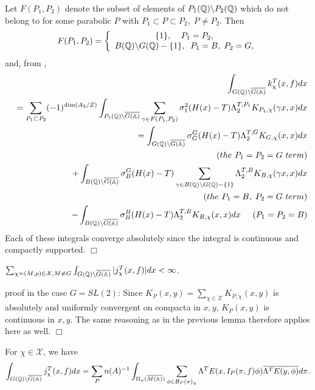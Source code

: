 Let $F(P_1,P_2)$ denote the subset of elements of
$P_1(\mathbb{Q} )\backslash P_2(\mathbb{Q} )$ which do not belong
to for some parabolic $P$ with $P_1\subset
P\subset P_2,\;P\neq P_2$. Then 
\[
F(P_1,P_2)=\left\{ 
\begin{array}{c}
\{1\},\;\;\;\;P_1=P_2, \\ 
B(\mathbb{Q} )\backslash G(\mathbb{Q} )-\{1\},\;\;P_1=B,\;P_2=G,
\end{array}
\right. 
\]
and, from \cite[p. 105]{A3}, 
\begin{eqnarray*}
&&\int_{G(\mathbb{Q} )\backslash \overline{G(\mathbb{A} )}}
k_\chi ^T(x,f)dx \\
&&=\sum_{P_1\subset P_2}(-1)^{\dim (A_2/Z)}
\int_{P_1(\mathbb{Q} )\backslash \overline{G(\mathbb{A} )}}
\sum_{\gamma \in F(P_1,P_2)}\sigma _1^2(H(x)-T)
\Lambda_2^{T,P_1}K_{P_1,\chi }(\gamma x,x)dx \\
&&=\int_{G(\mathbb{Q} )\backslash \overline{G(\mathbb{A} )}}
\sigma _G^G(H(x)-T)\Lambda_2^{T,G}K_{G,\chi }(x,x)dx\\
&&\;\;\;\;\;(the\ P_1=P_2=G\ term) \\
&&+\int_{B(\mathbb{Q} )\backslash \overline{G(\mathbb{A} )}}
\sigma _B^G(H(x)-T)
\sum_{\gamma\in B(\mathbb{Q} )\backslash G(\mathbb{Q} )-\{1\}}
\Lambda _2^{T,B}K_{B,\chi }(\gamma x,x)dx\\
&&\;\;\;\;\;(the\ P_1 =B,\;P_2=G\ term) \\
&&-\int_{B(\mathbb{Q} )\backslash \overline{G(\mathbb{A} )}}
\sigma _B^B(H(x)-T)\Lambda_2^{T,B}K_{B,\chi }(x,x)dx
\;\;\;\;\;(P_1 =P_2=B)
\end{eqnarray*}
Each of these integrals converge absolutely since the integral is continuous
and compactly supported. $\Box $

\begin{lemma}\label{lem:5.25}
$\sum_{ \chi =(M,\rho )\in \mathcal{X}, M\neq G }
\int_{G(\mathbb{Q} )\backslash \overline{G(\mathbb{A} )}}
|j_\chi ^T(x,f)|dx<\infty $.
\end{lemma}

proof in the case $G=SL(2)$: Since
$K_P(x,y)=\sum_{\chi \in {\mathcal{X}}}K_{P,\chi }(x,y)$
is absolutely and uniformly convergent on compacta in
$x,y $, $K_P(x,y)$ is continuous in $x,y$. The same
reasoning as in the
previous lemma therefore applies here as well. $\Box $

\begin{lemma}\label{lem:5.26}
For $\chi \in \mathcal{X}$, we have 
\[
\int_{G(\mathbb{Q} )\backslash \overline{G(\mathbb{A} )}}
j_\chi^T(x,f)dx=\sum_Pn(A)^{-1}
\int_{\Pi _u(\overline{M(\mathbb{A} )})}
\sum_{\phi \in {\mathcal{B}}_P(\pi )_\chi }
\Lambda ^TE(x,I_P(\pi ,f)\phi )\overline{\Lambda ^TE(y,\phi )}d\pi .
\]
\end{lemma}


